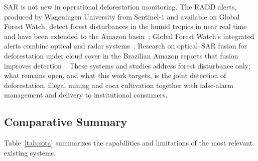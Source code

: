 \documentclass{article}
\begin{document}
SAR is not new in operational deforestation monitoring.
The RADD alerts, produced by Wageningen University from Sentinel-1 and
available on Global Forest Watch, detect forest disturbances in the humid
tropics in near real time and have been extended to the Amazon
basin~\cite{reiche2021radd,gfw_radd}; Global Forest Watch's integrated alerts
combine optical and radar systems~\cite{gfw_integrated}.
Research on optical--SAR fusion for deforestation under cloud cover in the
Brazilian Amazon reports that fusion improves detection~\cite{ferrari2023}.
These systems and studies address forest disturbance only; what remains open,
and what this work targets, is the joint detection of deforestation, illegal
mining and coca cultivation together with false-alarm management and delivery
to institutional consumers.

\subsection{Comparative Summary}

Table~\ref{tab:sota} summarizes the capabilities and limitations of the most
relevant existing systems.

\begin{table}[ht]
\centering
\caption{Comparison of existing satellite monitoring systems}
\label{tab:sota}
\end{table}
\end{document}
